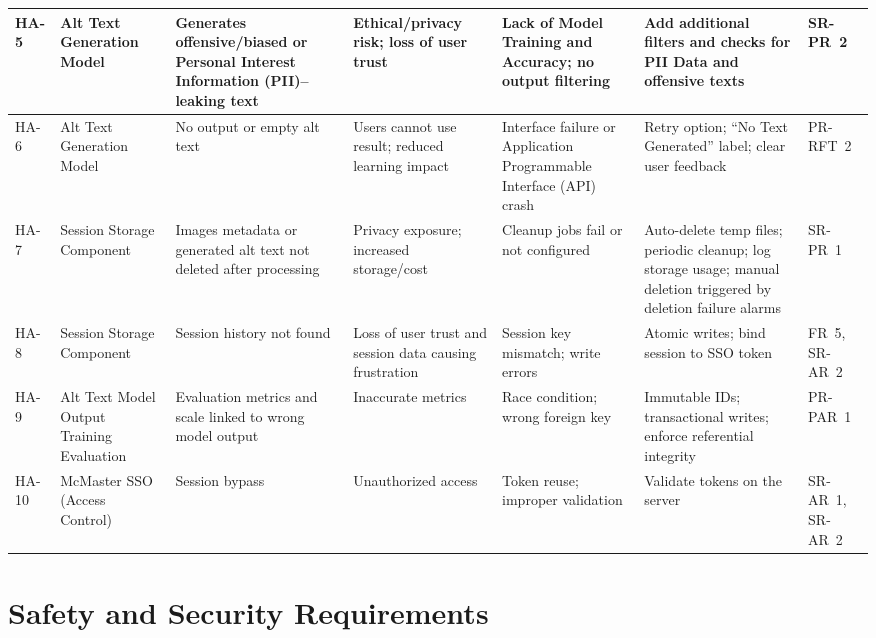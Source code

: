 \documentclass{article}
\begin{document}
\begin{landscape}
\begin{longtable}{|p{1.2cm}|p{2.0cm}|p{3.0cm}|p{3.2cm}|p{3.2cm}|p{4.0cm}|p{2.6cm}|}
    HA-5 & Alt Text Generation Model &
    Generates offensive/biased or Personal Interest Information (PII)–leaking text &
    Ethical/privacy risk; loss of user trust &
    Lack of Model Training and Accuracy; no output filtering &
    Add additional filters and checks for PII Data and offensive texts &
    SR-PR~2 \\ \hline
    
    HA-6 & Alt Text Generation Model &
    No output or empty alt text &
    Users cannot use result; reduced learning impact &
    Interface failure or Application Programmable Interface (API) crash &
    Retry option; “No Text Generated” label; clear user feedback &
    PR-RFT~2 \\ \hline
    
    HA-7 & Session Storage Component &
    Images metadata or generated alt text not deleted after processing &
    Privacy exposure; increased storage/cost &
    Cleanup jobs fail or not configured &
    Auto-delete temp files; periodic cleanup; log storage usage; manual deletion triggered by deletion failure alarms &
    SR-PR~1 \\ \hline
    
    HA-8 & Session Storage Component &
    Session history not found &
    Loss of user trust and session data causing frustration &
    Session key mismatch; write errors &
    Atomic writes; bind session to SSO token &
    FR~5, SR-AR~2 \\ \hline
    
    HA-9 & Alt Text Model Output Training Evaluation &
    Evaluation metrics and scale linked to wrong model output &
    Inaccurate metrics &
    Race condition; wrong foreign key &
    Immutable IDs; transactional writes; enforce referential integrity &
    PR-PAR~1 \\ \hline
    
    HA-10 & McMaster SSO (Access Control) &
    Session bypass &
    Unauthorized access &
    Token reuse; improper validation &
    Validate tokens on the server &
    SR-AR~1, SR-AR~2 \\ \hline

    \end{longtable}
    
\end{landscape}
    
    
\section{Safety and Security Requirements}
\end{document}

